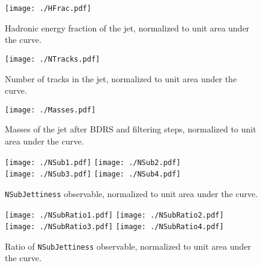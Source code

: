 \begin{figure}
    \begin{center}
        \texttt{[image: ./HFrac.pdf]}
        \caption{ Hadronic energy fraction of the jet, normalized to unit area under the curve. }
        \label{fig:HFrac}
    \end{center}
\end{figure}

\begin{figure}
    \begin{center}
        \texttt{[image: ./NTracks.pdf]}
        \caption{ Number of tracks in the jet, normalized to unit area under the curve. }
        \label{fig:NTracks}
    \end{center}
\end{figure}

\begin{figure}
    \begin{center}
        \texttt{[image: ./Masses.pdf]}
        \caption{ Masses of the jet after BDRS and filtering steps, normalized to unit area under the curve. }
        \label{fig:Masses}
    \end{center}
\end{figure}

\begin{figure}
    \begin{center}
        \texttt{[image: ./NSub1.pdf]}
        \texttt{[image: ./NSub2.pdf]}\\
        \texttt{[image: ./NSub3.pdf]}
        \texttt{[image: ./NSub4.pdf]}\\
        \caption{ {\tt NSubJettiness} observable, normalized to unit area under the curve. }
        \label{fig:NSub}
    \end{center}
\end{figure}

\begin{figure}
    \begin{center}
        \texttt{[image: ./NSubRatio1.pdf]}
        \texttt{[image: ./NSubRatio2.pdf]}\\
        \texttt{[image: ./NSubRatio3.pdf]}
        \texttt{[image: ./NSubRatio4.pdf]}\\
        \caption{ Ratio of {\tt NSubJettiness} observable, normalized to unit area under the curve. }
        \label{fig:NSubRatio}
    \end{center}
\end{figure}
